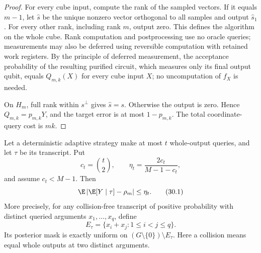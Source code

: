 \begin{proof}
For every cube input, compute the rank of the sampled vectors. If it equals \(m-1\), let \(\widehat s\) be the unique nonzero vector orthogonal to all samples and output \(\widehat s_1\). For every other rank, including rank \(m\), output zero. This defines the algorithm on the whole cube. Rank computation and postprocessing use no oracle queries; measurements may also be deferred using reversible computation with retained work registers.
By the principle of deferred measurement, the acceptance probability of the resulting purified circuit, which measures only its final output qubit, equals \(Q_{m,k}(X)\) for every cube input \(X\); no uncomputation of \(f_X\) is needed.

On \(H_m\), full rank within \(s^\perp\) gives \(\widehat s=s\). Otherwise the output is zero. Hence
\(Q_{m,k}=p_{m,k}Y\), and the target error is at most \(1-p_{m,k}\).
The total coordinate-query cost is \(mk\).
\end{proof}

\begin{lemma}\label{ian:simon-adaptive-posterior}
Let a deterministic adaptive strategy make at most \(t\) whole-output queries, and let \(\tau\) be its transcript. Put
\[
 c_t=\binom t2,
 \qquad
 \eta_t=\frac{2c_t}{M-1-c_t},
\]
and assume \(c_t<M-1\). Then
\[
 \E\left|\E[Y\mid\tau]-\rho_m\right|
 \le\eta_t.
 \tag{30.1}\label{ian:simon-transcript-bound}
\]
More precisely, for any collision-free transcript of positive probability with distinct queried arguments
\(x_1,\ldots,x_q\), define
\[
 E_\tau=\{x_i+x_j:1\le i<j\le q\}.
\]
Its posterior mask is exactly uniform on
\((G\setminus\{0\})\setminus E_\tau\).
Here a collision means equal whole outputs at two distinct arguments.
\end{lemma}

